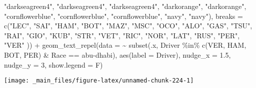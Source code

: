 \documentclass[
]{book}
\newenvironment{Shaded}{\begin{snugshade}}{\end{snugshade}}
\newcommand{\AttributeTok}[1]{\textcolor[rgb]{0.77,0.63,0.00}{#1}}
\newcommand{\DecValTok}[1]{\textcolor[rgb]{0.00,0.00,0.81}{#1}}
\newcommand{\FloatTok}[1]{\textcolor[rgb]{0.00,0.00,0.81}{#1}}
\newcommand{\FunctionTok}[1]{\textcolor[rgb]{0.00,0.00,0.00}{#1}}
\newcommand{\NormalTok}[1]{#1}
\newcommand{\SpecialCharTok}[1]{\textcolor[rgb]{0.00,0.00,0.00}{#1}}
\newcommand{\StringTok}[1]{\textcolor[rgb]{0.31,0.60,0.02}{#1}}
\begin{document}
\begin{Shaded}
\begin{Highlighting}[]
                                \StringTok{"darkseagreen4"}\NormalTok{, }\StringTok{"darkseagreen4"}\NormalTok{, }\StringTok{"darkseagreen4"}\NormalTok{,}
                                \StringTok{"darkorange"}\NormalTok{, }\StringTok{"darkorange"}\NormalTok{,}
                                \StringTok{"cornflowerblue"}\NormalTok{, }\StringTok{"cornflowerblue"}\NormalTok{, }\StringTok{"cornflowerblue"}\NormalTok{,}
                                \StringTok{"navy"}\NormalTok{, }\StringTok{"navy"}\NormalTok{),}
                     \AttributeTok{breaks =} \FunctionTok{c}\NormalTok{(}\StringTok{"LEC"}\NormalTok{, }\StringTok{"SAI"}\NormalTok{,}
                                \StringTok{"HAM"}\NormalTok{, }\StringTok{"BOT"}\NormalTok{, }
                                \StringTok{"MAZ"}\NormalTok{, }\StringTok{"MSC"}\NormalTok{, }
                                \StringTok{"OCO"}\NormalTok{, }\StringTok{"ALO"}\NormalTok{,}
                                \StringTok{"GAS"}\NormalTok{, }\StringTok{"TSU"}\NormalTok{,  }
                                \StringTok{"RAI"}\NormalTok{, }\StringTok{"GIO"}\NormalTok{, }\StringTok{"KUB"}\NormalTok{,}
                                \StringTok{"STR"}\NormalTok{, }\StringTok{"VET"}\NormalTok{,  }
                                \StringTok{"RIC"}\NormalTok{, }\StringTok{"NOR"}\NormalTok{,}
                                \StringTok{"LAT"}\NormalTok{, }\StringTok{"RUS"}\NormalTok{,}
                                \StringTok{"PER"}\NormalTok{, }\StringTok{"VER"}
\NormalTok{                                )) }\SpecialCharTok{+}
  \FunctionTok{geom\_text\_repel}\NormalTok{(}\AttributeTok{data =} \SpecialCharTok{\textasciitilde{}} \FunctionTok{subset}\NormalTok{(.x, Driver }\SpecialCharTok{\%in\%} \FunctionTok{c}\NormalTok{(}\StringTok{\textquotesingle{}VER\textquotesingle{}}\NormalTok{, }\StringTok{\textquotesingle{}HAM\textquotesingle{}}\NormalTok{, }\StringTok{\textquotesingle{}BOT\textquotesingle{}}\NormalTok{, }\StringTok{\textquotesingle{}PER\textquotesingle{}}\NormalTok{) }\SpecialCharTok{\&}\NormalTok{ Race }\SpecialCharTok{==} \StringTok{\textquotesingle{}abu{-}dhabi\textquotesingle{}}\NormalTok{),}
            \FunctionTok{aes}\NormalTok{(}\AttributeTok{label =}\NormalTok{ Driver),}
            \AttributeTok{nudge\_x =} \FloatTok{1.5}\NormalTok{, }\AttributeTok{nudge\_y =} \DecValTok{3}\NormalTok{, }\AttributeTok{show.legend =}\NormalTok{ F)}
\end{Highlighting}
\end{Shaded}

\begin{center}\texttt{[image: \_main\_files/figure-latex/unnamed-chunk-224-1]} \end{center}
\end{document}
